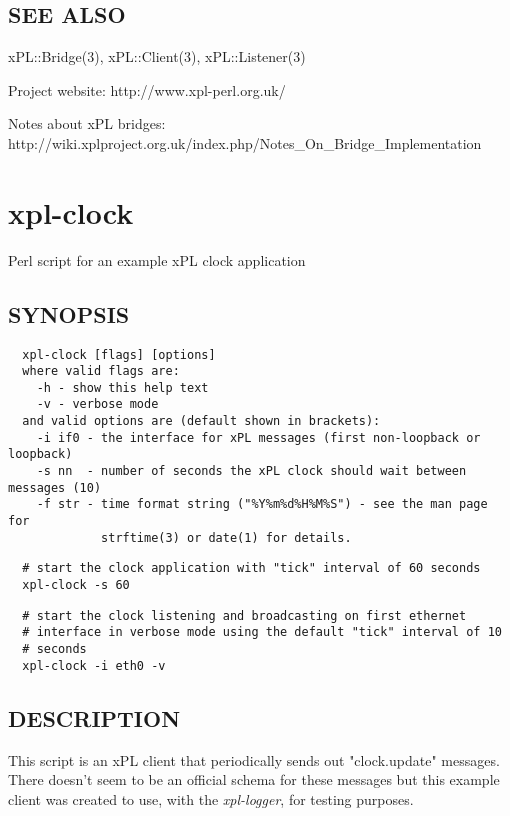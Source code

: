 \subsection*{SEE ALSO\label{xpl-bridge_SEE_ALSO}}


xPL::Bridge(3), xPL::Client(3), xPL::Listener(3)



Project website: http://www.xpl-perl.org.uk/



Notes about xPL bridges:
http://wiki.xplproject.org.uk/index.php/Notes\_On\_Bridge\_Implementation

\section{xpl-clock\label{xpl-clock}}


Perl script for an example xPL clock application

\subsection*{SYNOPSIS\label{xpl-clock_SYNOPSIS}}
\begin{verbatim}
  xpl-clock [flags] [options]
  where valid flags are:
    -h - show this help text
    -v - verbose mode
  and valid options are (default shown in brackets):
    -i if0 - the interface for xPL messages (first non-loopback or loopback)
    -s nn  - number of seconds the xPL clock should wait between messages (10)
    -f str - time format string ("%Y%m%d%H%M%S") - see the man page for
             strftime(3) or date(1) for details.
\end{verbatim}
\begin{verbatim}
  # start the clock application with "tick" interval of 60 seconds
  xpl-clock -s 60
\end{verbatim}
\begin{verbatim}
  # start the clock listening and broadcasting on first ethernet
  # interface in verbose mode using the default "tick" interval of 10
  # seconds
  xpl-clock -i eth0 -v
\end{verbatim}
\subsection*{DESCRIPTION\label{xpl-clock_DESCRIPTION}}


This script is an xPL client that periodically sends out
"clock.update" messages.  There doesn't seem to be an official
schema for these messages but this example client was created
to use, with the \emph{xpl-logger}, for testing purposes.

